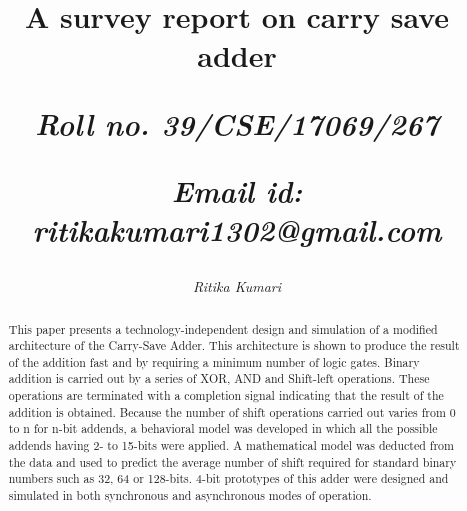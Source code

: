 \documentclass[11pt, twoside]{article}
\begin{document}
\begin{center}


\title{\begin{huge}\textbf{A survey report on carry save adder}\end{huge}}
\maketitle

\author{\begin{large}\textit{Ritika Kumari}\end{large}}

\title{\begin{large}\textit{Roll no. 39/CSE/17069/267}\end{large}}
\maketitle

\title{\begin{large}\textit{Email id: ritikakumari1302@gmail.com}\end{large}}
\maketitle


\end{center}

\begin{abstract}

This paper presents a technology-independent design and simulation of a modified architecture of the Carry-Save Adder. This architecture is shown to produce the result of the addition fast and by requiring a minimum number of logic gates. Binary addition is carried out by a series of XOR, AND and Shift-left operations. These operations are terminated with a completion signal indicating that the result of the addition is obtained. Because the number of shift operations carried out varies from 0 to n for n-bit addends, a behavioral model was developed in which all the possible addends having 2- to 15-bits were applied. A mathematical model was deducted from the data and used to predict the average number of shift required for standard binary numbers such as 32, 64 or 128-bits. 4-bit prototypes of this adder were designed and simulated in both synchronous and asynchronous modes of operation.


\end{abstract}
\end{document}
